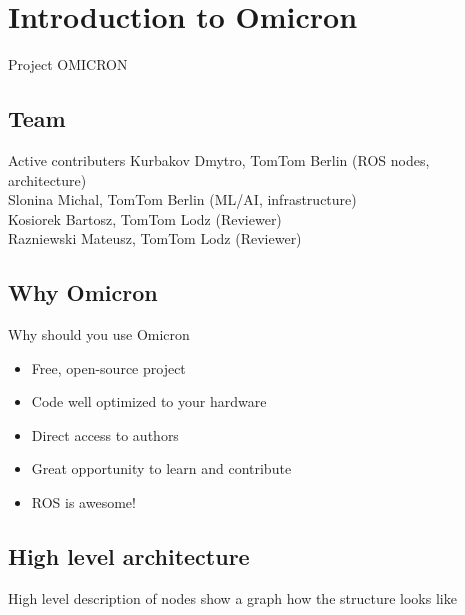 \documentclass{beamer}
\begin{document}
\section{Introduction to Omicron}
\begin{frame}
\begin{center}
\Huge Project OMICRON
\end{center}
\end{frame}

\subsection{Team}
\begin{frame}{Active contributers}
Kurbakov Dmytro, TomTom Berlin (ROS nodes, architecture)\\
Slonina Michal, TomTom Berlin (ML/AI, infrastructure)\\
Kosiorek Bartosz, TomTom Lodz (Reviewer)\\
Razniewski Mateusz, TomTom Lodz (Reviewer)\\
\end{frame}

\subsection{Why Omicron}
\begin{frame}{Why should you use Omicron}
\begin{itemize}
\item Free, open-source project
\item Code well optimized to your hardware
\item Direct access to authors
\item Great opportunity to learn and contribute
\item ROS is awesome!
\end{itemize}

\end{frame}

\subsection{High level architecture}
\begin{frame}{High level description of nodes}
show a graph how the structure looks like
\end{frame}
\end{document}
